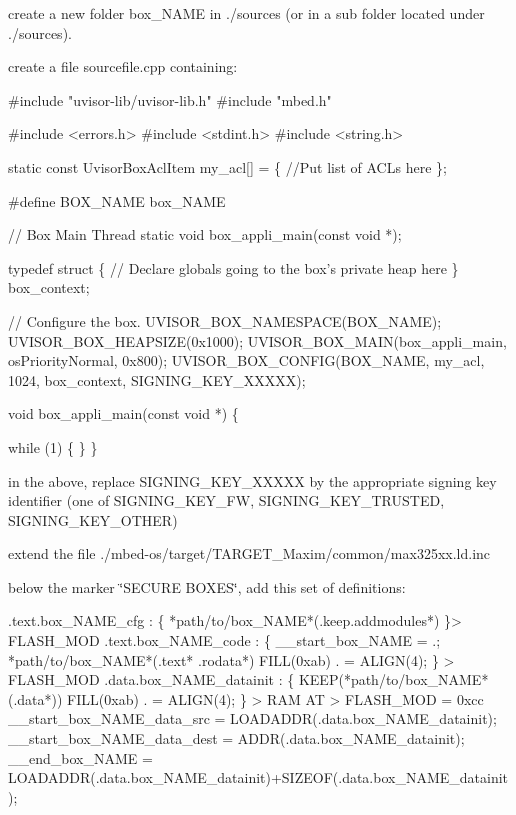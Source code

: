 \begin{DoxyEnumerate}
\item create a new folder box\+\_\+\+N\+A\+ME in ./sources (or in a sub folder located under ./sources).
\item create a file sourcefile.\+cpp containing\+:
\begin{DoxyCode}
\textcolor{preprocessor}{  #include "uvisor-lib/uvisor-lib.h"}
\textcolor{preprocessor}{  #include "mbed.h"}

\textcolor{preprocessor}{  #include <errors.h>}
\textcolor{preprocessor}{  #include <stdint.h>}
\textcolor{preprocessor}{  #include <string.h>}

  \textcolor{keyword}{static} \textcolor{keyword}{const} UvisorBoxAclItem my\_acl[] = \{
   \textcolor{comment}{//Put list of ACLs here}
  \};

\textcolor{preprocessor}{#define BOX\_NAME box\_NAME}

\textcolor{comment}{// Box Main Thread}
\textcolor{keyword}{static} \textcolor{keywordtype}{void} box\_appli\_main(\textcolor{keyword}{const} \textcolor{keywordtype}{void} *);

\textcolor{keyword}{typedef} \textcolor{keyword}{struct }\{
  \textcolor{comment}{// Declare globals going to the box's private heap here}
\} box\_context;

\textcolor{comment}{// Configure the  box.}
UVISOR\_BOX\_NAMESPACE(BOX\_NAME);
UVISOR\_BOX\_HEAPSIZE(0x1000);
UVISOR\_BOX\_MAIN(box\_appli\_main, osPriorityNormal, 0x800);
UVISOR\_BOX\_CONFIG(BOX\_NAME, my\_acl, 1024, box\_context, SIGNING\_KEY\_XXXXX);

\textcolor{keywordtype}{void} box\_appli\_main(\textcolor{keyword}{const} \textcolor{keywordtype}{void} *) \{

  \textcolor{keywordflow}{while} (1) \{
  \}
\}
\end{DoxyCode}

\item in the above, replace S\+I\+G\+N\+I\+N\+G\+\_\+\+K\+E\+Y\+\_\+\+X\+X\+X\+XX by the appropriate signing key identifier (one of S\+I\+G\+N\+I\+N\+G\+\_\+\+K\+E\+Y\+\_\+\+FW, S\+I\+G\+N\+I\+N\+G\+\_\+\+K\+E\+Y\+\_\+\+T\+R\+U\+S\+T\+ED, S\+I\+G\+N\+I\+N\+G\+\_\+\+K\+E\+Y\+\_\+\+O\+T\+H\+ER)
\item extend the file ./mbed-\/os/target/\+T\+A\+R\+G\+E\+T\+\_\+\+Maxim/common/max325xx.ld.\+inc
\item below the marker \char`\"{}\+S\+E\+C\+U\+R\+E B\+O\+X\+E\+S\char`\"{}, add this set of definitions\+:
\begin{DoxyCode}
.text.box\_NAME\_cfg :
 \{
   *path/to/box\_NAME*(.keep.addmodules*)
 \}> FLASH\_MOD
 .text.box\_NAME\_code :
 \{
   \_\_start\_box\_NAME = .;
   *path/to/box\_NAME*(.text* .rodata*)
   FILL(0xab)
   . = ALIGN(4);
 \} > FLASH\_MOD
 .data.box\_NAME\_datainit :
 \{
     KEEP(*path/to/box\_NAME*(.data*))
     FILL(0xab)
     . = ALIGN(4);
 \} > RAM  AT > FLASH\_MOD = 0xcc
 \_\_start\_box\_NAME\_data\_src  = LOADADDR(.data.box\_NAME\_datainit);
 \_\_start\_box\_NAME\_data\_dest = ADDR(.data.box\_NAME\_datainit);
 \_\_end\_box\_NAME             = LOADADDR(.data.box\_NAME\_datainit)+SIZEOF(.data.box\_NAME\_datainit);
\end{DoxyCode}


\end{DoxyEnumerate}
